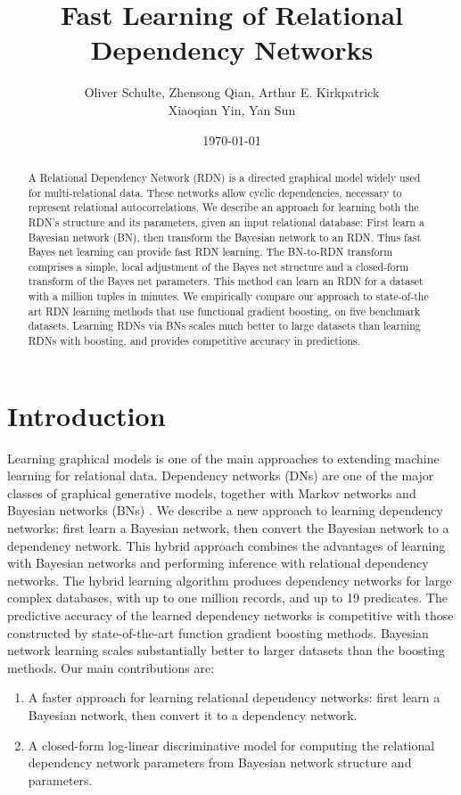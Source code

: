 \documentclass[runningheads,a4paper]{llncs}
\title{Fast Learning of Relational Dependency Networks}
\author{ Oliver Schulte, Zhensong Qian, Arthur E. Kirkpatrick\\ Xiaoqian Yin, Yan Sun 
}
\institute{ School of Computing Science, Simon Fraser University, Canada\\
\{oschulte,zqian,ted,xiaoqian\_yin,sunyans\}@sfu.ca\\}
\date{\today}
\begin{document}
\maketitle



\begin{abstract} 
A Relational Dependency Network (RDN) is a directed graphical model widely used for multi-relational data. These networks allow cyclic dependencies, necessary to represent relational autocorrelations. We describe an approach for learning both the RDN's structure and its parameters, given an input relational database: First learn a Bayesian network (BN), then transform the Bayesian network to an RDN. Thus fast Bayes net learning can provide fast RDN learning. The BN-to-RDN transform comprises a simple, local adjustment of the Bayes net structure and a closed-form transform of the Bayes net parameters. This method can learn an RDN for a dataset with a million tuples in minutes. We empirically compare our approach to state-of-the art RDN learning methods that use functional gradient boosting, on five benchmark datasets. Learning RDNs via BNs scales much better to large datasets than learning RDNs with boosting, and provides competitive accuracy in predictions.\end{abstract}


 \section{Introduction} \label{sec:intro} Learning graphical models is one of the main approaches to extending machine learning for relational data. 
Dependency networks (DNs) \cite{Heckerman2000} are one of the major classes of graphical generative models, together with Markov networks and Bayesian networks (BNs) \cite{Pearl1988}. We describe a new approach to learning dependency networks: first learn a Bayesian network, then convert the Bayesian network to a dependency network. 
This hybrid approach combines the advantages of learning with Bayesian networks and performing inference with relational dependency networks. 
The hybrid learning algorithm produces dependency networks for large complex databases, with up to one million records, and up to 19 predicates. The predictive accuracy of the learned dependency networks is competitive with those constructed by state-of-the-art function gradient boosting methods.
Bayesian network learning scales substantially better   to larger datasets than the boosting methods.
%
Our main contributions are:
\begin{enumerate}
\item A faster approach for learning relational dependency networks: first learn a Bayesian network, then convert it to a dependency network.
\item A closed-form log-linear discriminative model for computing the relational dependency network parameters from Bayesian network structure and parameters.
\end{enumerate}
  
\end{document}
